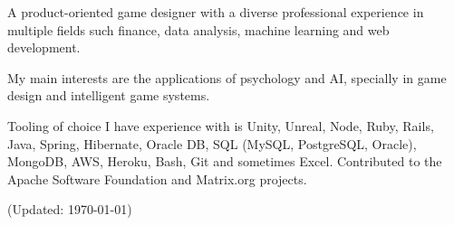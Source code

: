 \documentclass[11pt,a4paper]{moderncv}
\begin{document}
\maketitle

A product-oriented game designer with a diverse professional experience in multiple fields such finance, data analysis, machine learning and web development. 

My main interests are the applications of psychology and AI, specially in game design and intelligent game systems.

Tooling of choice I have experience with is Unity, Unreal, Node, Ruby, Rails, Java, Spring, Hibernate, Oracle DB, SQL (MySQL, PostgreSQL, Oracle), MongoDB, AWS, Heroku, Bash, Git and sometimes Excel. Contributed to the Apache Software Foundation and Matrix.org projects.

(Updated: \today)
\end{document}
